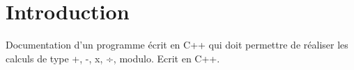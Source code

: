 \hypertarget{index_intro_sec}{}\section{Introduction}\label{index_intro_sec}
Documentation d'un programme écrit en C++ qui doit permettre de réaliser les calculs de type +, -\/, x, ÷, modulo. Ecrit en C++.

\par
\par
 